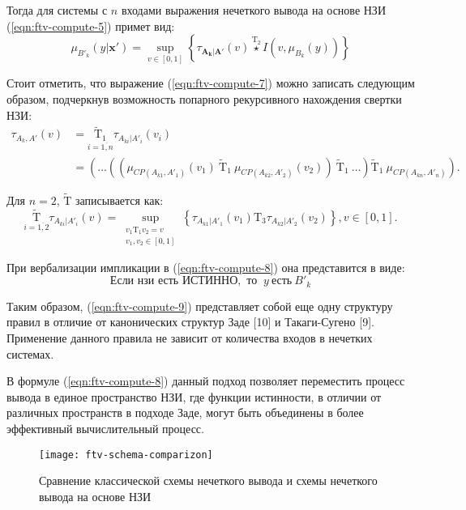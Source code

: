 Тогда для системы с $n$ входами выражения нечеткого вывода на основе НЗИ (\ref{eqn:ftv-compute-5}) примет вид:
\begin{equation}
\label{eqn:ftv-compute-8}
\mu_{B'_k}(y|\mathbf{x'}) = \sup_{v \in [0, 1]} \left\{\tau_{\mathbf{A_k}|\mathbf{A'}}(v) \overset{\mathrm{T_2}}{\star} I(v, \mu_{B_k}(y))\right\}
\end{equation}

Стоит отметить, что выражение (\ref{eqn:ftv-compute-7}) можно записать следующим образом, подчеркнув возможность попарного рекурсивного нахождения свертки НЗИ:
\begin{align*}
\tau_{A_k, A'}(v) & = \underset{i=\overline{1,n}}{\mathrm{\tilde{T}_1}}\tau_{A_{ki}|A'_i}(v_i) \\
& = \left(\dots\left(\left(\mu_{CP(A_{k1}, A'_1)}(v_1)\ \mathrm{\tilde{T}_1}\ \mu_{CP(A_{k2}, A'_2)}(v_2)\right)\ \mathrm{\tilde{T}_1}\ \dots \right) \mathrm{\tilde{T}_1}\ \mu_{CP(A_{kn}, A'_n)}\right).
\end{align*}

Для $n=2$, $\mathrm{\tilde{T}}$ записывается как:
\begin{equation*}
\underset{i=\overline{1,2}}{\mathrm{\tilde{T}}} \tau_{A_{ki}|A'_i}(v) = \sup_{\substack{v_1 \mathrm{ T_1 } v_2 = v \\ v_1, v_2 \in [0, 1]}} \left\{ \tau_{A_{k1}|A'_1}(v_1) \mathrm{ T_3 } \tau_{A_{k2}|A'_2}(v_2) \right\}, v \in [0,1].
\end{equation*}

При вербализации импликации в (\ref{eqn:ftv-compute-8}) она представится в виде:
\begin{equation}
\label{eqn:ftv-compute-9}
\text{Если } \textit{нзи} \text{ есть } \text{ИСТИННО}, \text{ то }\ y\ \text{есть}\ B'_k
\end{equation}

Таким образом, (\ref{eqn:ftv-compute-9}) представляет собой еще одну структуру правил в отличие от канонических структур Заде [10] и Такаги-Сугено [9]. Применение данного правила не зависит от количества входов в нечетких системах.

В формуле (\ref{eqn:ftv-compute-8}) данный подход позволяет переместить процесс вывода в единое пространство НЗИ, где функции истинности, в отличии от различных пространств в подходе Заде, могут быть объединены в более эффективный вычислительный процесс.

\begin{figure}
\label{fig:ftv-schema-comparizon}
\centering
\texttt{[image: ftv-schema-comparizon]}
\caption{Сравнение классической схемы нечеткого вывода и схемы нечеткого вывода на основе НЗИ}
\end{figure}

